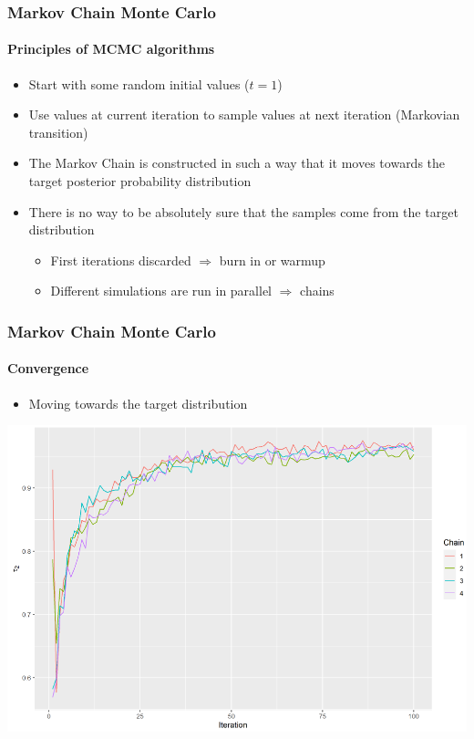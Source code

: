 \documentclass{beamer}
\begin{document}
\begin{frame}
\frametitle{Markov Chain Monte Carlo}
\framesubtitle{Principles of MCMC algorithms}
 \begin{itemize}
  \item{Start with some random initial values ($t=1$)}
  \item{Use values at current iteration to sample values at next iteration (Markovian transition)}
  \item{The Markov Chain is constructed in such a way that it moves towards the target posterior probability distribution}
  \item{There is no way to be absolutely sure that the samples come from the target distribution}
  \begin{itemize}
   \item{First iterations discarded $\Rightarrow$ burn in or warmup}
   \item{Different simulations are run in parallel $\Rightarrow$ chains}
  \end{itemize}
 \end{itemize}
\end{frame}

\begin{frame}
\frametitle{Markov Chain Monte Carlo}
\framesubtitle{Convergence}
\begin{itemize}
 \item{Moving towards the target distribution}
\end{itemize}
\includegraphics[width=\textwidth]{imgs/convergence.png}
\end{frame}
\end{document}
